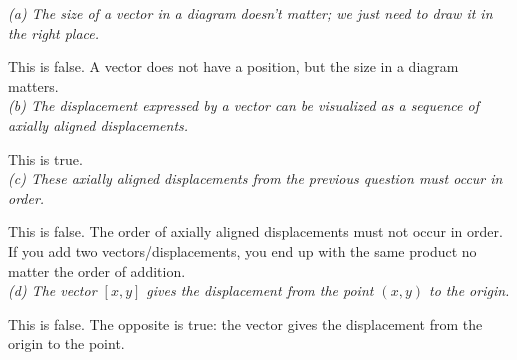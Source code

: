 \documentclass[12pt, a4paper]{article}
\begin{document}
\textit
{
	(a) The size of a vector in a diagram doesn't matter; we just need
	to draw it in the right place.\\
}

This is false. A vector does not have a position, but the size in a diagram matters.\\

\textit
{
	(b) The displacement expressed by a vector can be visualized as a
	sequence of axially aligned displacements.\\
}

This is true.\\

\textit
{
	(c) These axially aligned displacements from the previous question
	must occur in order.\\
}

This is false. The order of axially aligned displacements must not occur in order. If you add two vectors/displacements, you end up with the same product no matter the order of addition.\\

\textit
{
	 (d) The vector $[x, y]$ gives the displacement from the point $(x,
	 y)$ to the origin.\\
}

This is false. The opposite is true: the vector gives the displacement from the origin to the point.\\
\end{document}
